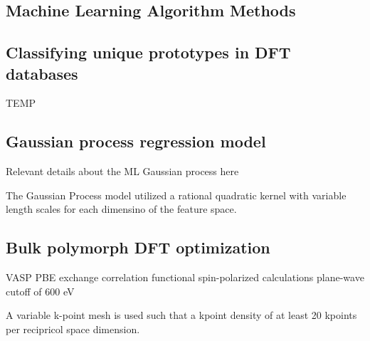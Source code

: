 
\subsection{Machine Learning Algorithm Methods}

\subsection{Classifying unique prototypes in DFT databases}
TEMP


\subsection{Gaussian process regression model}
Relevant details about the ML Gaussian process here  %

The Gaussian Process model utilized a rational quadratic kernel with variable length scales for each dimensino of the feature space.

\subsection{Bulk polymorph DFT optimization}
VASP
PBE exchange correlation functional
spin-polarized calculations
plane-wave cutoff of 600 eV

A variable k-point mesh is used such that a kpoint density of at least 20 kpoints per recipricol space dimension.

